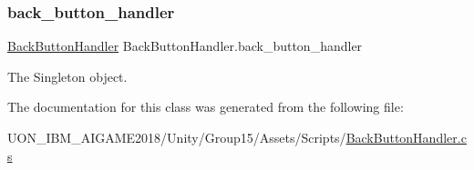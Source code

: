 \subsubsection{\texorpdfstring{back\_button\_handler}{back\_button\_handler}}
{\footnotesize\ttfamily \mbox{\hyperlink{class_back_button_handler}{Back\+Button\+Handler}} Back\+Button\+Handler.\+back\+\_\+button\+\_\+handler\hspace{0.3cm}{\ttfamily [static]}}



The Singleton object. 



The documentation for this class was generated from the following file\+:\begin{DoxyCompactItemize}
\item 
U\+O\+N\+\_\+\+I\+B\+M\+\_\+\+A\+I\+G\+A\+M\+E2018/\+Unity/\+Group15/\+Assets/\+Scripts/\mbox{\hyperlink{_back_button_handler_8cs}{Back\+Button\+Handler.\+cs}}\end{DoxyCompactItemize}
